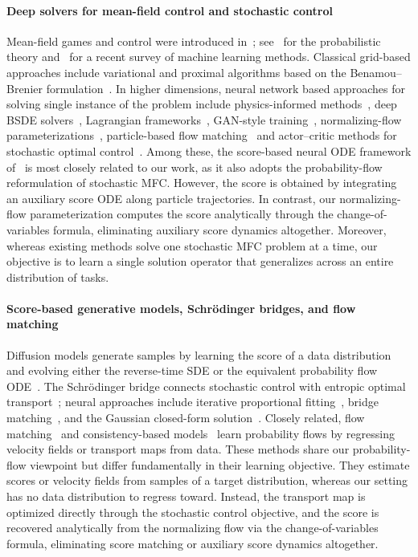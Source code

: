\documentclass[preprint]{elsarticle}
\begin{document}
\paragraph{Deep solvers for mean-field control and stochastic control}
Mean-field games and control were introduced in~\cite{lasry2007mfg,huang2006large}; see~\cite{carmona2018probabilistic} for the probabilistic theory and~\cite{RuimengHu2024Recent} for a recent survey of machine learning methods. Classical grid-based approaches include variational and proximal algorithms based on the Benamou--Brenier formulation~\cite{Benamou2000ACF,Benamou2015,yu2024fast,Beck2008FISTA}. In higher dimensions, neural network based approaches for solving single instance of the problem include physics-informed methods~\cite{raissi2019pinn,sirignano2018dgm,weinan2018deepritz}, deep BSDE solvers~\cite{han2018solving}, Lagrangian frameworks~\cite{ruthotto2020machine}, GAN-style training~\cite{lin2021apacnet}, normalizing-flow parameterizations~\cite{huang2023bridging}, particle-based flow matching~\cite{yu2026high} and actor--critic methods for stochastic optimal control~\cite{zhou2021actor,zhou2024actor}.  
Among these, the score-based neural ODE framework of~\cite{zhou2025score} is most closely related to our work, as it also adopts the probability-flow reformulation of stochastic MFC. However, the score is obtained by integrating an auxiliary score ODE along particle trajectories. In contrast, our normalizing-flow parameterization computes the score analytically through the change-of-variables formula, eliminating auxiliary score dynamics altogether. Moreover, whereas existing methods solve one stochastic MFC problem at a time, our objective is to learn a single solution operator that generalizes across an entire distribution of tasks.


\paragraph{Score-based generative models, Schr\"odinger bridges, and flow matching}
Diffusion models generate samples by learning the score of a data distribution and evolving either the reverse-time SDE or the equivalent probability flow ODE~\cite{anderson1982reverse,song2021score}. The Schr\"odinger bridge connects stochastic control with entropic optimal transport~\cite{chen2016relation,chen2021liaisons}; neural approaches include iterative proportional fitting~\cite{debortoli2021dsb}, bridge matching~\cite{shi2023dsbm}, and the Gaussian closed-form solution~\cite{bunne2023schrodinger}. Closely related, flow matching~\cite{lipman2023flow,chen2024flow} and consistency-based models~\cite{kim2023ctm,boffi2024flowmap} learn probability flows by regressing velocity fields or transport maps from data. These methods share our probability-flow viewpoint but differ fundamentally in their learning objective. They estimate scores or velocity fields from samples of a target distribution, whereas our setting has no data distribution to regress toward. Instead, the transport map is optimized directly through the stochastic control objective, and the score is recovered analytically from the normalizing flow via the change-of-variables formula, eliminating score matching or auxiliary score dynamics altogether.
\end{document}
